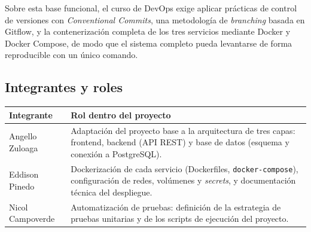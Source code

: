 Sobre esta base funcional, el curso de DevOps exige aplicar prácticas de control de versiones con \emph{Conventional Commits}, una metodología de \emph{branching} basada en Gitflow, y la contenerización completa de los tres servicios mediante Docker y Docker Compose, de modo que el sistema completo pueda levantarse de forma reproducible con un único comando.

\subsection{Integrantes y roles}

\begin{center}
\begin{tabularx}{\textwidth}{@{}l>{\raggedright\arraybackslash}X@{}}
\toprule
\textbf{Integrante} & \textbf{Rol dentro del proyecto} \\
\midrule
Angello Zuloaga & Adaptación del proyecto base a la arquitectura de tres capas: frontend, backend (API REST) y base de datos (esquema y conexión a PostgreSQL). \\
Eddison Pinedo & Dockerización de cada servicio (Dockerfiles, \texttt{docker-compose}), configuración de redes, volúmenes y \emph{secrets}, y documentación técnica del despliegue. \\
Nicol Campoverde & Automatización de pruebas: definición de la estrategia de pruebas unitarias y de los scripts de ejecución del proyecto. \\
\bottomrule
\end{tabularx}
\end{center}
